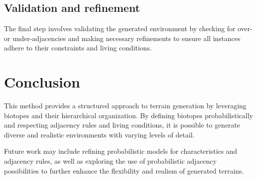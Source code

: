 \subsection{Validation and refinement}
The final step involves validating the generated environment by checking for over- or under-adjacencies and making necessary refinements to ensure all instances adhere to their constraints and living conditions.

\section{Conclusion}
This method provides a structured approach to terrain generation by leveraging biotopes and their hierarchical organization. By defining biotopes probabilistically and respecting adjacency rules and living conditions, it is possible to generate diverse and realistic environments with varying levels of detail.

Future work may include refining probabilistic models for characteristics and adjacency rules, as well as exploring the use of probabilistic adjacency possibilities to further enhance the flexibility and realism of generated terrains.